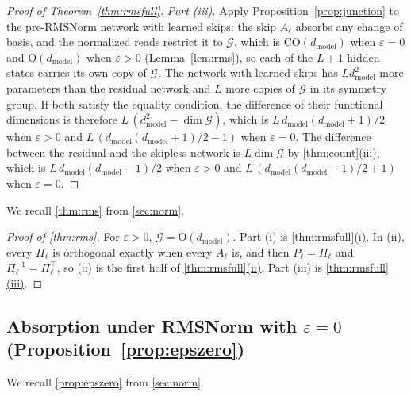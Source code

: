 \documentclass[10pt]{article}
\theoremstyle{definition}
\theoremstyle{remark}
\newcommand{\dm}{d_{\mathrm{model}}}
\newcommand{\Ort}{\mathrm{O}}
\newcommand{\CO}{\mathrm{CO}}
\newcommand{\G}{\mathcal{G}}
\DeclareRobustCommand{\cpref}[2]{\hyperref[#1:#2]{\cref*{#1}(#2)}}
\begin{document}
\begin{proof}[Proof of Theorem~\ref{thm:rmsfull}]
\emph{Part (iii).} Apply Proposition~\ref{prop:junction} to the pre-RMSNorm network with learned skips: the skip $A_\ell$ absorbs any change of basis, and the normalized reads restrict it to $\G$, which is $\CO(\dm)$ when $\varepsilon = 0$ and $\Ort(\dm)$ when $\varepsilon > 0$ (Lemma~\ref{lem:rms}), so each of the $L+1$ hidden states carries its own copy of $\G$. The network with learned skips has $L\dm^2$ more parameters than the residual network and $L$ more copies of $\G$ in its symmetry group. If both satisfy the equality condition, the difference of their functional dimensions is therefore $L\,(\dm^2 - \dim\G)$, which is $L\,\dm(\dm+1)/2$ when $\varepsilon > 0$ and $L\,(\dm(\dm+1)/2 - 1)$ when $\varepsilon = 0$. The difference between the residual and the skipless network is $L\dim\G$ by \cpref{thm:count}{iii}, which is $L\,\dm(\dm-1)/2$ when $\varepsilon > 0$ and $L\,(\dm(\dm-1)/2 + 1)$ when $\varepsilon = 0$.
\end{proof}

We recall \cref{thm:rms} from \cref{sec:norm}.
\thmRMS*

\begin{proof}[Proof of \cref{thm:rms}]
For $\varepsilon > 0$, $\G = \Ort(\dm)$. Part (i) is \cpref{thm:rmsfull}{i}. In (ii), every $\Pi_\ell$ is orthogonal exactly when every $A_\ell$ is, and then $P_\ell = \Pi_\ell$ and $\Pi_\ell^{-1} = \Pi_\ell^\top$, so (ii) is the first half of \cpref{thm:rmsfull}{ii}. Part (iii) is \cpref{thm:rmsfull}{iii}.
\end{proof}

\subsection{Absorption under RMSNorm with \texorpdfstring{$\varepsilon = 0$ (Proposition~\ref*{prop:epszero})}{epsilon = 0}}\label{app:prf-epszero}

We recall \cref{prop:epszero} from \cref{sec:norm}.
\propEpsZero*
\end{document}
